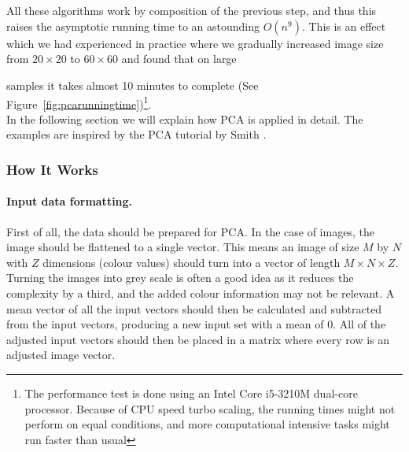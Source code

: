 \begin{minipage}{\linewidth}
\centering
{}
\label{fig:pcarunningtime}
\end{minipage}\\\\

All these algorithms work by composition of the previous step, and thus this raises the asymptotic running time to an astounding $\mathit{O}(n^9)$.
This is an effect which we had experienced in practice where we gradually increased image size from $20 \times 20$ to $60 \times 60$ and found that on large

samples it takes almost 10 minutes to complete (See Figure~\ref{fig:pcarunningtime})\footnote{The performance test is done using an Intel Core i5-3210M dual-core processor. Because of CPU speed turbo scaling, the running times might not perform on equal conditions, and more computational intensive tasks might run faster than usual}.\\


In the following section we will explain how PCA is applied in detail. The examples are inspired by the PCA tutorial by Smith \cite{smith2002tutorial}.

\subsubsection{How It Works}
\label{ssub:HowItWorks}
\paragraph{Input data formatting.}
First of all, the data should be prepared for PCA.
In the case of images, the image should be flattened to a single vector.
This means an image of size $M$ by $N$ with $Z$ dimensions (colour values) should turn into a vector of length $M\times N\times Z$.
Turning the images into grey scale is often a good idea as it reduces the complexity by a third, and the added colour information may not be relevant.
A mean vector of all the input vectors should then be calculated and subtracted from the input vectors, producing a new input set with a mean of 0.
All of the adjusted input vectors should then be placed in a matrix where every row is an adjusted image vector.

